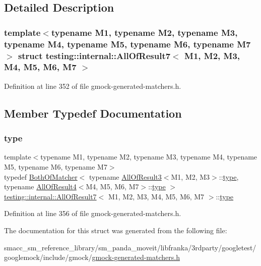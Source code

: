 \subsection{Detailed Description}
\subsubsection*{template$<$typename M1, typename M2, typename M3, typename M4, typename M5, typename M6, typename M7$>$\newline
struct testing\+::internal\+::\+All\+Of\+Result7$<$ M1, M2, M3, M4, M5, M6, M7 $>$}



Definition at line 352 of file gmock-\/generated-\/matchers.\+h.



\subsection{Member Typedef Documentation}
\mbox{\label{structtesting_1_1internal_1_1AllOfResult7_a47ab0d670258434b0e65530591948e8c}} 
\subsubsection{\texorpdfstring{type}{type}}
{\footnotesize\ttfamily template$<$typename M1, typename M2, typename M3, typename M4, typename M5, typename M6, typename M7$>$ \\
typedef \hyperlink{classtesting_1_1internal_1_1BothOfMatcher}{Both\+Of\+Matcher}$<$ typename \hyperlink{structtesting_1_1internal_1_1AllOfResult3}{All\+Of\+Result3}$<$M1, M2, M3$>$\+::\hyperlink{structtesting_1_1internal_1_1AllOfResult7_a47ab0d670258434b0e65530591948e8c}{type}, typename \hyperlink{structtesting_1_1internal_1_1AllOfResult4}{All\+Of\+Result4}$<$M4, M5, M6, M7$>$\+::\hyperlink{structtesting_1_1internal_1_1AllOfResult7_a47ab0d670258434b0e65530591948e8c}{type} $>$ \hyperlink{structtesting_1_1internal_1_1AllOfResult7}{testing\+::internal\+::\+All\+Of\+Result7}$<$ M1, M2, M3, M4, M5, M6, M7 $>$\+::\hyperlink{structtesting_1_1internal_1_1AllOfResult7_a47ab0d670258434b0e65530591948e8c}{type}}



Definition at line 356 of file gmock-\/generated-\/matchers.\+h.



The documentation for this struct was generated from the following file\+:\begin{DoxyCompactItemize}
\item 
smacc\+\_\+sm\+\_\+reference\+\_\+library/sm\+\_\+panda\+\_\+moveit/libfranka/3rdparty/googletest/googlemock/include/gmock/\hyperlink{gmock-generated-matchers_8h}{gmock-\/generated-\/matchers.\+h}\end{DoxyCompactItemize}
